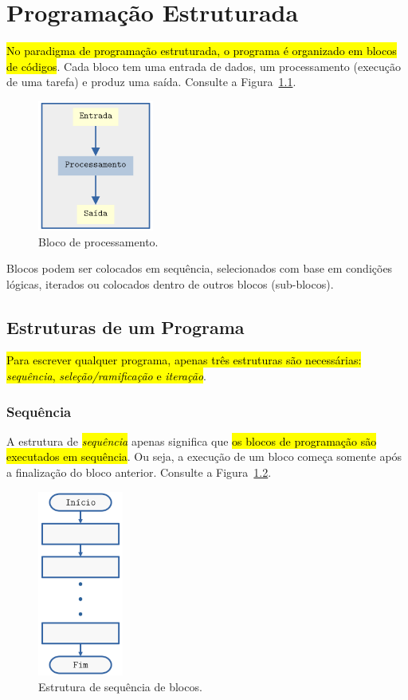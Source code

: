 \chapter{Programação Estruturada}\label{cap_progest}

\hl{No paradigma de programação estruturada, o programa é organizado em blocos de códigos}. Cada bloco tem uma entrada de dados, um processamento (execução de uma tarefa) e produz uma saída. Consulte a Figura~\ref{cap_progest:fig:fg_bloco}.

\begin{figure}[H]
  \centering
  \includegraphics[width=1.5in]{./cap_progest/dados/fig_fg_bloco/fig.png}
  \caption{Bloco de processamento.}
  \label{cap_progest:fig:fg_bloco}
\end{figure}

Blocos podem ser colocados em sequência, selecionados com base em condições lógicas, iterados ou colocados dentro de outros blocos (sub-blocos).

\section{Estruturas de um Programa}\label{cap_progest_sec_est}

\hl{Para escrever qualquer programa, apenas três estruturas são necessárias: \emph{sequência}, \emph{seleção/ramificação} e \emph{iteração}}.

\subsection{Sequência}

A estrutura de \hl{\emph{sequência}} apenas significa que \hl{os blocos de programação são executados em sequência}. Ou seja, a execução de um bloco começa somente após a finalização do bloco anterior. Consulte a Figura~\ref{cap_progest:fig:fg_sequencia}.

\begin{figure}[H]
  \centering
  \includegraphics[width=1.1in]{./cap_progest/dados/fig_fg_sequencia/fig.png}
  \caption{Estrutura de sequência de blocos.}
  \label{cap_progest:fig:fg_sequencia}
\end{figure}

